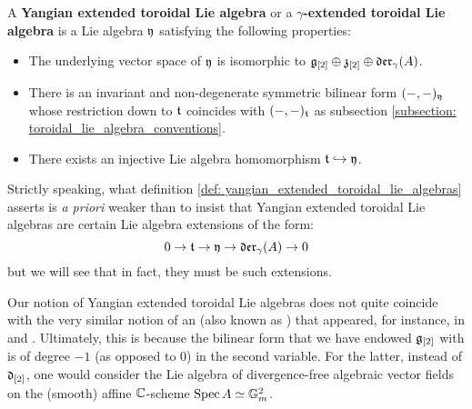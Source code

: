         \begin{definition} \label{def: yangian_extended_toroidal_lie_algebras}
            A \textbf{Yangian extended toroidal Lie algebra} or a \textbf{$\gamma$-extended toroidal Lie algebra} is a Lie algebra $\mathfrak{y}$ satisfying the following properties:
            \begin{itemize}
                \item The underlying vector space of $\mathfrak{y}$ is isomorphic to $\mathfrak{g}_{[2]} \oplus \mathfrak{z}_{[2]} \oplus \mathfrak{der}_{\gamma}(A)$.
                \item There is an invariant and non-degenerate symmetric bilinear form $(-, -)_{\mathfrak{y}}$ whose restriction down to $\mathfrak{t}$ coincides with $(-, -)_{\mathfrak{t}}$ as subsection \ref{subsection: toroidal_lie_algebra_conventions}.
                \item There exists an injective Lie algebra homomorphism $\mathfrak{t} \hookrightarrow \mathfrak{y}$.
            \end{itemize}
        \end{definition}
        \begin{remark}
            Strictly speaking, what definition \ref{def: yangian_extended_toroidal_lie_algebras} asserts is \textit{a priori} weaker than to insist that Yangian extended toroidal Lie algebras are certain Lie algebra extensions of the form:
                $$0 \to \mathfrak{t} \to \mathfrak{y} \to \mathfrak{der}_{\gamma}(A) \to 0$$
            but we will see that in fact, they must be such extensions.
        \end{remark}
        \begin{remark}
            Our notion of Yangian extended toroidal Lie algebras does not quite coincide with the very similar notion of an  (also known as ) that appeared, for instance, in \cite{billig_representations_of_toroidal_extended_affine_lie_algebras} and \cite{neher_lectures_on_EALAs}. Ultimately, this is because the bilinear form that we have endowed $\mathfrak{g}_{[2]}$ with is of degree $-1$ (as opposed to $0$) in the second variable. For the latter, instead of $\mathfrak{d}_{[2]}$, one would consider the Lie algebra of divergence-free algebraic vector fields on the (smooth) affine $\mathbb{C}$-scheme $\operatorname{Spec} A \simeq \mathbb{G}_m^2$.
        \end{remark}
        
